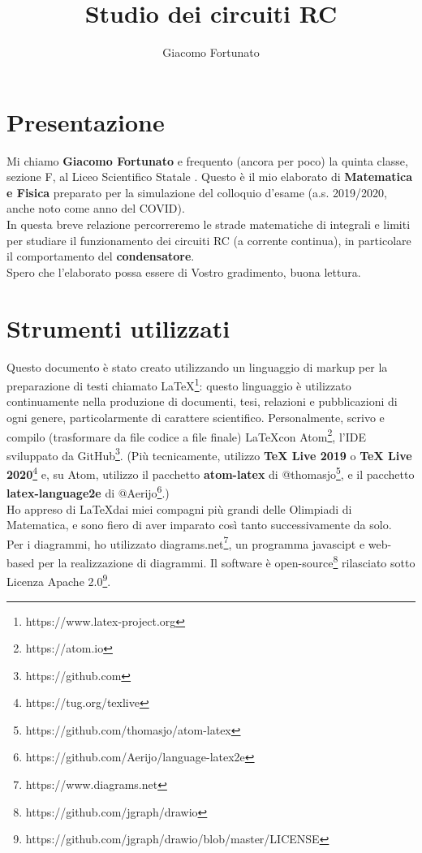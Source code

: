 \documentclass[a3paper, twoside, openany]{book}
\title{Studio dei circuiti RC}
\author{Giacomo Fortunato}
\theoremstyle{definition}
\begin{document}
\maketitle
\section{Presentazione}
Mi chiamo \textbf{Giacomo Fortunato} e frequento (ancora per poco) la quinta classe, sezione F, al Liceo Scientifico Statale . Questo è il mio elaborato di \textbf{Matematica e Fisica} preparato per la simulazione del colloquio d'esame (a.s. 2019/2020, anche noto come anno del COVID). \\ In questa breve relazione percorreremo le strade matematiche di integrali e limiti per studiare il funzionamento dei circuiti RC (a corrente continua), in particolare il comportamento del \textbf{condensatore}. \\ Spero che l'elaborato possa essere di Vostro gradimento, buona lettura.
\section{Strumenti utilizzati}
Questo documento è stato creato utilizzando un linguaggio di markup per la preparazione di testi chiamato \LaTeX\footnote{https://www.latex-project.org}: questo linguaggio è utilizzato continuamente nella produzione di documenti, tesi, relazioni e pubblicazioni di ogni genere, particolarmente di carattere scientifico. Personalmente, scrivo e compilo (trasformare da file codice a file finale) \LaTeX con Atom\footnote{https://atom.io}, l'IDE sviluppato da GitHub\footnote{https://github.com}. (Più tecnicamente, utilizzo \textbf{TeX Live 2019} o \textbf{TeX Live 2020}\footnote{https://tug.org/texlive} e, su Atom, utilizzo il pacchetto \textbf{atom-latex} di @thomasjo\footnote{https://github.com/thomasjo/atom-latex}, e il pacchetto \mbox{\textbf{latex-language2e}} di @Aerijo\footnote{https://github.com/Aerijo/language-latex2e}.) \\ Ho appreso di \LaTeX dai miei compagni più grandi delle Olimpiadi di Matematica, e sono fiero di aver imparato così tanto successivamente da solo. \\ Per i diagrammi, ho utilizzato diagrams.net\footnote{https://www.diagrams.net}, un programma javascipt e web-based per la realizzazione di diagrammi. Il software è open-source\footnote{https://github.com/jgraph/drawio} rilasciato sotto Licenza Apache 2.0\footnote{https://github.com/jgraph/drawio/blob/master/LICENSE}.
\end{document}
